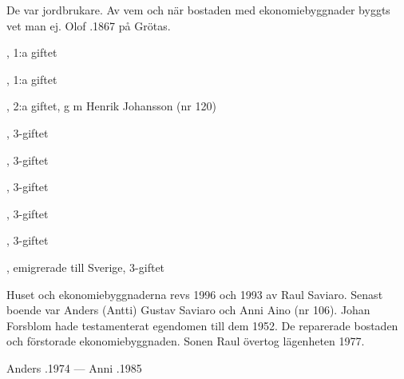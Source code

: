 De var jordbrukare. Av vem och när bostaden med ekonomiebyggnader byggts vet man ej. Olof .1867 på Grötas.
\begin{jhchildren}
  \item {}, 1:a giftet
  \item {}, 1:a giftet
  \item {}, 2:a giftet, g m Henrik Johansson (nr 120)
  \item {}, 3-giftet
  \item {}, 3-giftet
  \item {}, 3-giftet
  \item {}, 3-giftet
  \item {}, 3-giftet
  \item {}, emigrerade till Sverige, 3-giftet
\end{jhchildren}



%



%
Huset och ekonomiebyggnaderna revs 1996 och 1993 av Raul Saviaro. Senast boende var Anders (Antti) Gustav Saviaro och Anni Aino (nr 106). Johan Forsblom hade testamenterat egendomen till dem 1952. De reparerade bostaden och förstorade ekonomiebyggnaden. Sonen Raul övertog lägenheten 1977.

Anders .1974 --- Anni .1985


